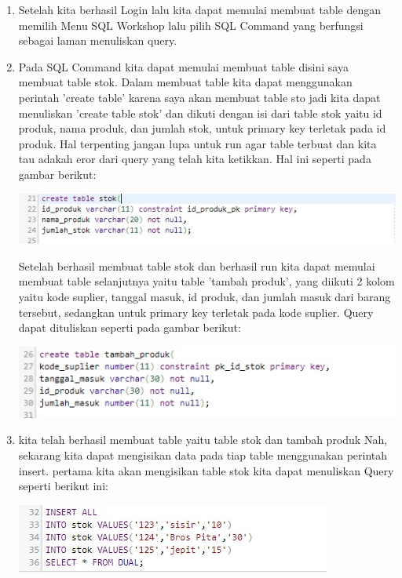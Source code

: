 \documentclass[a4paper,12pt]{report}
\begin{document}
\begin{enumerate}
\begin{center}
    \end{center}
    \item Setelah kita berhasil Login lalu kita dapat memulai membuat table dengan memilih Menu SQL Workshop lalu pilih SQL Command yang berfungsi sebagai laman menuliskan query.
    \item Pada SQL Command kita dapat memulai membuat table disini saya membuat table stok. Dalam membuat table kita dapat menggunakan perintah 'create table' karena saya akan membuat table sto jadi kita dapat menuliskan 'create table stok' dan dikuti dengan isi dari table stok yaitu id produk, nama produk, dan jumlah stok, untuk primary key terletak pada id produk. Hal terpenting jangan lupa untuk run agar table terbuat dan kita tau adakah eror dari query yang telah kita ketikkan. Hal ini seperti pada gambar berikut:
    \begin{center}
    \includegraphics[width=11cm\textwidth]{figure/stok.jpg}
    \end{center}
    Setelah berhasil membuat table stok dan berhasil run kita dapat memulai membuat table selanjutnya yaitu table 'tambah produk', yang diikuti 2 kolom yaitu kode suplier, tanggal masuk, id produk, dan jumlah masuk dari barang tersebut, sedangkan untuk primary key terletak pada kode suplier. Query dapat dituliskan seperti pada gambar berikut:
    \begin{center}
    \includegraphics[width=11cm\textwidth]{figure/tambah_produk.jpg}
    \end{center}
    \item kita telah berhasil membuat table yaitu table stok dan tambah produk Nah, sekarang kita dapat mengisikan data pada tiap table menggunakan perintah insert. pertama kita akan mengisikan table stok kita dapat menuliskan Query seperti berikut ini:
    \begin{center}
    \includegraphics[width=11cm\textwidth]{figure/insertstok.jpg}

\end{center}
\end{enumerate}
\end{document}
